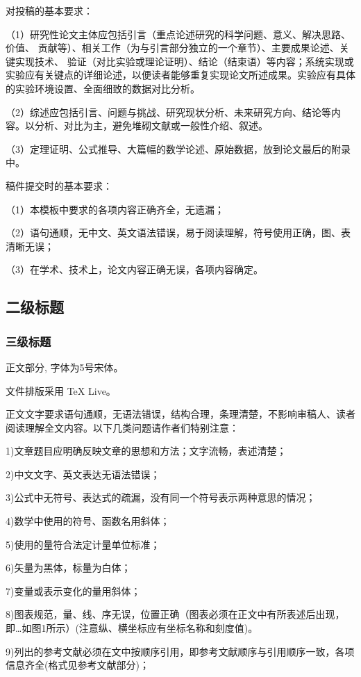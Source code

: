 \documentclass{cjc}
\begin{document}
对投稿的基本要求：

（1）研究性论文主体应包括引言（重点论述研究的科学问题、意义、解决思路、价值、
贡献等）、相关工作（为与引言部分独立的一个章节）、主要成果论述、关键实现技术、
验证（对比实验或理论证明）、结论（结束语）等内容；系统实现或实验应有关键点的详细论述，以便读者能够重复实现论文所述成果。实验应有具体的实验环境设置、全面细致的数据对比分析。

（2）综述应包括引言、问题与挑战、研究现状分析、未来研究方向、结论等内容。以分析、对比为主，避免堆砌文献或一般性介绍、叙述。

（3）定理证明、公式推导、大篇幅的数学论述、原始数据，放到论文最后的附录中。

稿件提交时的基本要求：

（1）本模板中要求的各项内容正确齐全，无遗漏；

（2）语句通顺，无中文、英文语法错误，易于阅读理解，符号使用正确，图、表清晰无误；

（3）在学术、技术上，论文内容正确无误，各项内容确定。

\subsection{二级标题}

\subsubsection{三级标题}

正文部分, 字体为5号宋体。

文件排版采用 TeX Live。

正文文字要求语句通顺，无语法错误，结构合理，条理清楚，不影响审稿人、读者阅读理解全文内容。以下几类问题请作者们特别注意：

1)文章题目应明确反映文章的思想和方法；文字流畅，表述清楚；

2)中文文字、英文表达无语法错误；

3)公式中无符号、表达式的疏漏，没有同一个符号表示两种意思的情况；

4)数学中使用的符号、函数名用斜体；

5)使用的量符合法定计量单位标准；

6)矢量为黑体，标量为白体；

7)变量或表示变化的量用斜体；

8)图表规范，量、线、序无误，位置正确（图表必须在正文中有所表述后出现，即…如图1所示）(注意纵、横坐标应有坐标名称和刻度值)。

9)列出的参考文献必须在文中按顺序引用，即参考文献顺序与引用顺序一致，各项信息齐全(格式见参考文献部分)；
\end{document}
